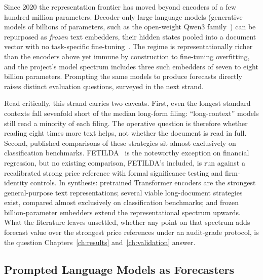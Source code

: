 Since 2020 the representation frontier has moved beyond encoders of a few hundred million parameters. Decoder-only large language models (generative models of billions of parameters, such as the open-weight Qwen3 family~\cite{qwen3_2025}) can be repurposed as \emph{frozen} text embedders, their hidden states pooled into a document vector with no task-specific fine-tuning~\cite{wang2024llmembed}. The regime is representationally richer than the encoders above yet immune by construction to fine-tuning overfitting, and the project's model spectrum includes three such embedders of seven to eight billion parameters. %
Prompting the same models to produce forecasts directly raises distinct evaluation questions, surveyed in the next strand.

Read critically, this strand carries two caveats. First, even the longest standard contexts fall sevenfold short of the median long-form filing: ``long-context'' models still read a minority of each filing. The operative question is therefore whether reading eight times more text %
helps, not whether the document is read in full. Second, published comparisons of these strategies sit almost exclusively on classification benchmarks. FETILDA~\cite{fetilda2022} is the noteworthy exception on financial regression, but no existing comparison, FETILDA's included, is run against a recalibrated strong price reference with formal significance testing and firm-identity controls. In synthesis: pretrained Transformer encoders are the strongest general-purpose text representations; several viable long-document strategies exist, compared almost exclusively on classification benchmarks; and frozen billion-parameter embedders extend the representational spectrum upwards. What the literature leaves unsettled, whether any point on that spectrum adds forecast value over the strongest price references under an audit-grade protocol, is the question Chapters~\ref{ch:results} and~\ref{ch:validation} answer.

\subsection{Prompted Language Models as Forecasters}
\label{sec:bg-prompted}


